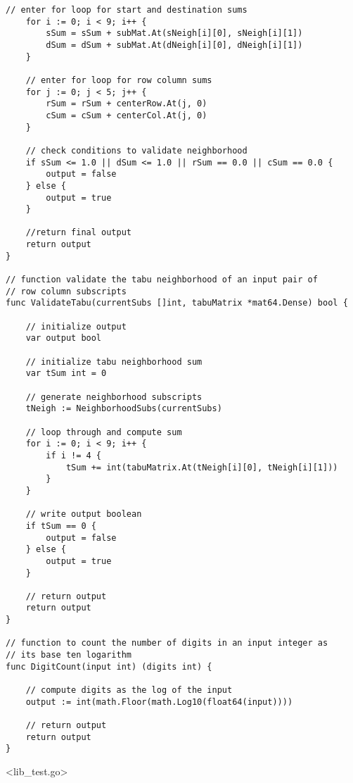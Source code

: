\begin{lstlisting}[basicstyle=\tiny]
	// enter for loop for start and destination sums
	for i := 0; i < 9; i++ {
		sSum = sSum + subMat.At(sNeigh[i][0], sNeigh[i][1])
		dSum = dSum + subMat.At(dNeigh[i][0], dNeigh[i][1])
	}

	// enter for loop for row column sums
	for j := 0; j < 5; j++ {
		rSum = rSum + centerRow.At(j, 0)
		cSum = cSum + centerCol.At(j, 0)
	}

	// check conditions to validate neighborhood
	if sSum <= 1.0 || dSum <= 1.0 || rSum == 0.0 || cSum == 0.0 {
		output = false
	} else {
		output = true
	}

	//return final output
	return output
}

// function validate the tabu neighborhood of an input pair of
// row column subscripts
func ValidateTabu(currentSubs []int, tabuMatrix *mat64.Dense) bool {

	// initialize output
	var output bool

	// initialize tabu neighborhood sum
	var tSum int = 0

	// generate neighborhood subscripts
	tNeigh := NeighborhoodSubs(currentSubs)

	// loop through and compute sum
	for i := 0; i < 9; i++ {
		if i != 4 {
			tSum += int(tabuMatrix.At(tNeigh[i][0], tNeigh[i][1]))
		}
	}

	// write output boolean
	if tSum == 0 {
		output = false
	} else {
		output = true
	}

	// return output
	return output
}

// function to count the number of digits in an input integer as
// its base ten logarithm
func DigitCount(input int) (digits int) {

	// compute digits as the log of the input
	output := int(math.Floor(math.Log10(float64(input))))

	// return output
	return output
}

\end{lstlisting}

\newpage

<lib\_test.go>

